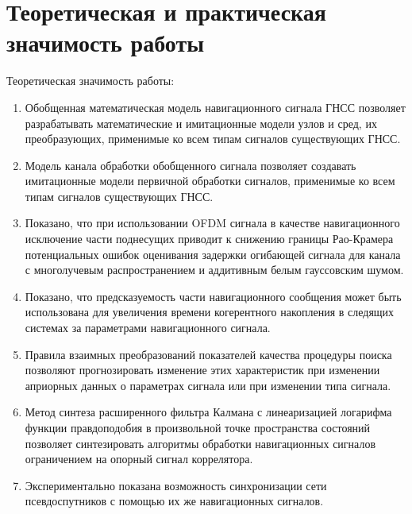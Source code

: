 \section*{Теоретическая и практическая значимость работы}

Теоретическая значимость работы:
\begin{enumerate}
\item Обобщенная математическая модель навигационного сигнала ГНСС позволяет разрабатывать математические и имитационные модели узлов и сред, их преобразующих, применимые ко всем типам сигналов существующих ГНСС.
\item Модель канала обработки обобщенного сигнала позволяет создавать имитационные модели первичной обработки сигналов, применимые ко всем типам сигналов существующих ГНСС.
\item Показано, что при использовании OFDM сигнала в качестве навигационного исключение части поднесущих приводит к снижению границы Рао-Крамера потенциальных ошибок оценивания задержки огибающей сигнала для канала с многолучевым распространением и аддитивным белым гауссовским шумом.
\item Показано, что предсказуемость части навигационного сообщения может быть использована для увеличения времени когерентного накопления в следящих системах за параметрами навигационного сигнала.
\item Правила взаимных преобразований показателей качества процедуры поиска позволяют прогнозировать изменение этих характеристик при изменении априорных данных о параметрах сигнала или при изменении типа сигнала.
\item Метод синтеза расширенного фильтра Калмана с линеаризацией логарифма функции правдоподобия в произвольной точке пространства состояний позволяет синтезировать алгоритмы обработки навигационных сигналов ограничением на опорный сигнал коррелятора.
\item Экспериментально показана возможность синхронизации сети псевдоспутников с помощью их же навигационных сигналов.
\end{enumerate}


